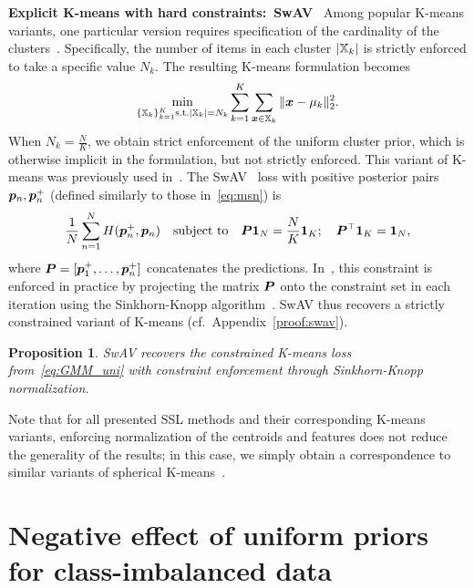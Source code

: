 \documentclass{article} %
\newtheorem{proposition}{Proposition}
\begin{document}
{\bf Explicit K-means with hard constraints:~SwAV}~
Among popular K-means variants, one particular version requires specification of the cardinality of the clusters~\citep{kleindessner2019fair, bradley2000constrained, rujeerapaiboon2019size}.
Specifically, the number of items in each cluster $\lvert{\mathbb{X}}_k\rvert$ is strictly enforced to take a specific value $N_k$.
The resulting K-means formulation becomes
\begin{equation}
    \min_{\{{\mathbb{X}}_k\}_{k=1}^K \text{s.t.} |{\mathbb{X}}_k|=N_k}
    \sum_{k=1}^K \sum_{{\bm{x}} \in {\mathbb{X}}_k} \|{\bm{x}}-\mu_k\|^2_2.\label{eq:constrained}
\end{equation}
When $N_k=\frac{N}{K}$, we obtain strict enforcement of the uniform cluster prior, which is otherwise implicit in the formulation, but not strictly enforced.
This variant of K-means was previously used in~\citet{wang2010learning}.
The SwAV~\citep{caron2020unsupervised} loss with  positive posterior pairs ${\bm{p}}_n,{\bm{p}}_n^+$ (defined similarly to those in~\eqref{eq:msn}) is
\begin{equation}
    \label{eq:swav}
    \frac{1}{N} \sum^N_{n=1} H({\bm{p}}_{n}^+, {\bm{p}}_n)
    \quad \text{subject to}
    \quad {\bm{P}} \mathbf{1}_N = \frac{N}{K} \mathbf{1}_K;
    \quad {\bm{P}}^\top \mathbf{1}_K = \mathbf{1}_N,
\end{equation}
where ${\bm{P}} = [{\bm{p}}^+_1, \ldots, {\bm{p}}^+_n]$ concatenates the predictions.
In~\citet{caron2020unsupervised}, this constraint is enforced in practice by projecting the matrix ${\bm{P}}$ onto the constraint set in each iteration using the Sinkhorn-Knopp algorithm~\citep{cuturi2013sinkhorn}.
SwAV thus recovers a strictly constrained variant of K-means (cf.~Appendix~\ref{proof:swav}).

\begin{proposition}
\label{prop:swav}
SwAV recovers the constrained K-means loss from~\eqref{eq:GMM_uni} with constraint enforcement through Sinkhorn-Knopp normalization.
\end{proposition}

Note that for all presented SSL methods and their corresponding K-means variants, enforcing normalization of the centroids and features does not reduce the generality of the results; in this case, we simply obtain a correspondence to similar variants of spherical K-means~\citep{hornik2012spherical}.


\section{Negative effect of uniform priors for class-imbalanced data}
\label{sec:class_stratified}
\end{document}
